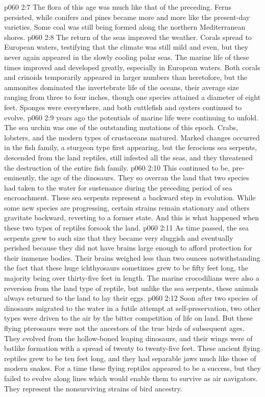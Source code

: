 \vs p060 2:7 The flora of this age was much like that of the preceding. Ferns persisted, while conifers and pines became more and more like the present\hyp{}day varieties. Some coal was still being formed along the northern Mediterranean shores.
\vs p060 2:8 The return of the seas improved the weather. Corals spread to European waters, testifying that the climate was still mild and even, but they never again appeared in the slowly cooling polar seas. The marine life of these times improved and developed greatly, especially in European waters. Both corals and crinoids temporarily appeared in larger numbers than heretofore, but the ammonites dominated the invertebrate life of the oceans, their average size ranging from three to four inches, though one species attained a diameter of eight feet. Sponges were everywhere, and both cuttlefish and oysters continued to evolve.
\vs p060 2:9 \pc {} years ago the potentials of marine life were continuing to unfold. The sea urchin was one of the outstanding mutations of this epoch. Crabs, lobsters, and the modern types of crustaceans matured. Marked changes occurred in the fish family, a sturgeon type first appearing, but the ferocious sea serpents, descended from the land reptiles, still infested all the seas, and they threatened the destruction of the entire fish family.
\vs p060 2:10 This continued to be, pre\hyp{}eminently, the age of the dinosaurs. They so overran the land that two species had taken to the water for sustenance during the preceding period of sea encroachment. These sea serpents represent a backward step in evolution. While some new species are progressing, certain strains remain stationary and others gravitate backward, reverting to a former state. And this is what happened when these two types of reptiles forsook the land.
\vs p060 2:11 As time passed, the sea serpents grew to such size that they became very sluggish and eventually perished because they did not have brains large enough to afford protection for their immense bodies. Their brains weighed less than two ounces notwithstanding the fact that these huge ichthyosaurs sometimes grew to be fifty feet long, the majority being over thirty\hyp{}five feet in length. The marine crocodilians were also a reversion from the land type of reptile, but unlike the sea serpents, these animals always returned to the land to lay their eggs.
\vs p060 2:12 Soon after two species of dinosaurs migrated to the water in a futile attempt at self\hyp{}preservation, two other types were driven to the air by the bitter competition of life on land. But these flying pterosaurs were not the ancestors of the true birds of subsequent ages. They evolved from the hollow\hyp{}boned leaping dinosaurs, and their wings were of batlike formation with a spread of twenty to twenty\hyp{}five feet. These ancient flying reptiles grew to be ten feet long, and they had separable jaws much like those of modern snakes. For a time these flying reptiles appeared to be a success, but they failed to evolve along lines which would enable them to survive as air navigators. They represent the nonsurviving strains of bird ancestry.
